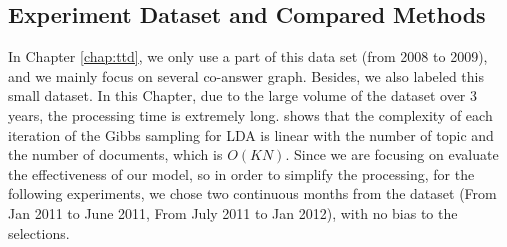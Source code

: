 {{{{{{{%

\subsection{Experiment Dataset and Compared Methods}
In Chapter \ref{chap:ttd}, we only use a part of this data set (from 2008 to 2009), and we mainly focus on several co-answer graph. Besides, we also labeled this small dataset.
In this Chapter, due to the large volume of the dataset over 3 years, the processing time is extremely long. \cite{chp7ldatimecomplexity} shows that the complexity of each iteration of the Gibbs sampling for LDA is linear with the number of topic and the number of documents, which is $O(KN)$.   Since we are focusing on evaluate the effectiveness of our model, so in order to simplify the processing, for the following experiments, we chose two continuous months from the dataset (From Jan 2011 to June 2011, From July 2011 to Jan 2012), with no bias to the selections.%



}}}}}}}
